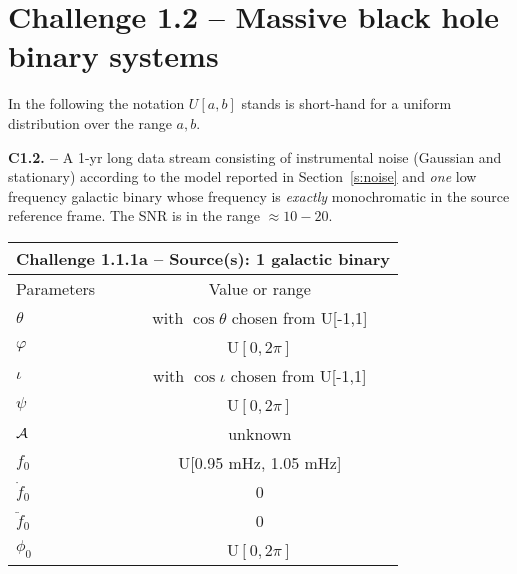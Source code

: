 \documentclass[11pt]{report}
\begin{document}
\begin{description}
\end{description}


\section{Challenge 1.2 -- Massive black hole binary systems}

In the following the notation $U[a,b]$ stands is short-hand for a uniform distribution over the range $a,b$.


\begin{description}

\item {\bf C1.2. -- } A 1-yr long data stream consisting of instrumental noise (Gaussian and stationary) according to the model reported in Section~\ref{s:noise} and {\em one} low frequency galactic binary whose frequency is {\em exactly} monochromatic in the source reference frame. The SNR is in the range $\approx 10-20$. 

\begin{center}
\begin{tabular}{l|c}
\hline \hline
\multicolumn{2}{c}{{\bf Challenge 1.1.1a -- Source(s): 1 galactic binary}} \\
\hline
Parameters & Value or range \\
\hline
$\theta$          & with $\cos\theta$ chosen from U[-1,1]\\
$\varphi$         & U$[0,2\pi]$ \\ 
$\iota$           & with $\cos\iota$ chosen from U[-1,1]\\ 
$\psi$            & U$[0,2\pi]$ \\
${\cal A}$        & unknown \\
$f_0$             & U[0.95 mHz, 1.05 mHz] \\ 
$\dot{f}_0$       & 0 \\ 
$\ddot{f}_0$      & 0\\ 
$\phi_0$          & U$[0,2\pi]$ \\
\hline \hline
\end{tabular} \\
\end{center}

\end{description}

\begin{thebibliography}{}

\end{thebibliography}
\end{document}
